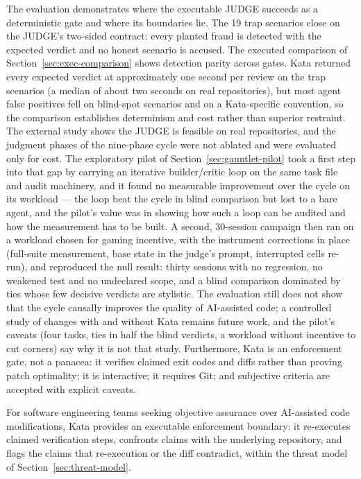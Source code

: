 \documentclass[11pt]{article}
\begin{document}
The evaluation demonstrates where the executable JUDGE succeeds as a
deterministic gate and where its boundaries lie. The 19 trap scenarios close
on the JUDGE's two-sided contract: every planted fraud is detected with the
expected verdict and no honest scenario is accused. The executed comparison of
Section~\ref{sec:exec-comparison} shows detection parity across gates. Kata
returned every expected verdict at approximately one second per review on the
trap scenarios (a median of about two seconds on real repositories), but most
agent false positives fell on blind-spot scenarios and on a Kata-specific
convention, so the comparison establishes determinism and cost rather than
superior restraint. The external study shows the JUDGE is feasible on real
repositories, and the judgment phases of the nine-phase cycle were not
ablated and were evaluated only for cost. The exploratory pilot of
Section~\ref{sec:gauntlet-pilot} took a first step into that gap by carrying an
iterative builder/critic loop on the same task file and audit machinery, and it
found no measurable improvement over the cycle on its workload --- the loop beat
the cycle in blind comparison but lost to a bare agent, and the pilot's value
was in showing how such a loop can be audited and how the measurement has to be
built. A second, 30-session campaign then ran on a workload chosen for gaming
incentive, with the instrument corrections in place (full-suite measurement,
base state in the judge's prompt, interrupted cells re-run), and reproduced the
null result: thirty sessions with no regression, no weakened test and no
undeclared scope, and a blind comparison dominated by ties whose few decisive
verdicts are stylistic. The evaluation still does not
show that the cycle causally improves the quality of AI-assisted code;
a controlled study of changes with and without Kata remains future work, and the
pilot's caveats (four tasks, ties in half the blind verdicts, a workload without
incentive to cut corners) say why it is not that study. Furthermore,
Kata is an enforcement gate, not a panacea: it verifies claimed exit codes and diffs
rather than proving patch optimality; it is interactive; it requires Git; and
subjective criteria are accepted with explicit caveats.

For software engineering teams seeking objective assurance over AI-assisted code
modifications, Kata provides an executable enforcement boundary: it re-executes
claimed verification steps, confronts claims with the underlying repository, and
flags the claims that re-execution or the diff contradict, within the threat
model of Section~\ref{sec:threat-model}.
\end{document}
